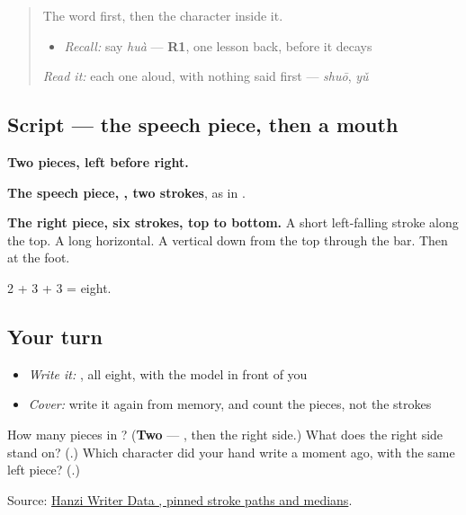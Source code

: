 \label{lesson:ZH-W53-hua}



\begin{quote}
The word first, then the character inside it.

\begin{itemize}
\raggedright
  \item \emph{Recall:} say \emph{huà} — \textbf{R1}, one lesson back, before it decays
\end{itemize}

\begin{quote}
 
\end{quote}

\emph{Read it:} each one aloud, with nothing said first — \emph{shuō}, \emph{yǔ}
\end{quote}

\subsection*{Script — the speech piece, then a mouth}

\begin{quote}
\end{quote}

\textbf{Two pieces, left before right.}

\textbf{The speech piece, , two strokes}, as in .

\textbf{The right piece, six strokes, top to bottom.} A short left-falling stroke along the top. A long horizontal. A vertical down from the top through the bar. Then  at the foot.

2 + 3 + 3 = eight.

\subsection*{Your turn}
\begin{itemize}
\raggedright
  \item \emph{Write it:} , all eight, with the model in front of you
  \item \emph{Cover:} write it again from memory, and count the pieces, not the strokes
\end{itemize}

\begin{tcolorbox}[breakable,colback=teal!4,colframe=teal!35!black,title={Before you move on}]
How many pieces in ? (\textbf{Two} — , then the right side.) What does the right side stand on? (\textbf{}.) Which character did your hand write a moment ago, with the same left piece? (\textbf{}.)

Source: \href{https://raw.githubusercontent.com/chanind/hanzi-writer-data/68d10a4b21150cae5e1ebbd223eed289cf32d90c/data/\%E8\%AF\%9D.json}{Hanzi Writer Data , pinned stroke paths and medians}.
\end{tcolorbox}
